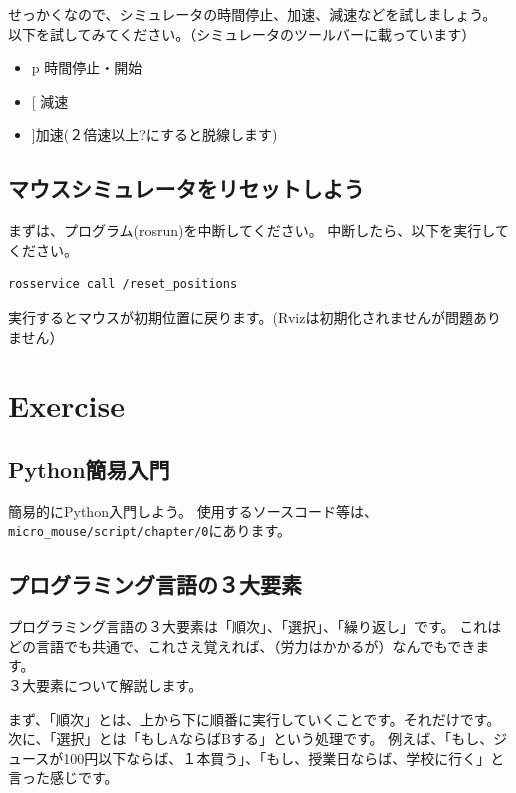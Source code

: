 \documentclass[11pt,a4paper]{jsarticle}
\begin{document}
せっかくなので、シミュレータの時間停止、加速、減速などを試しましょう。
以下を試してみてください。（シミュレータのツールバーに載っています）
\begin{itemize}
\item{ p} 時間停止・開始
\item{ [} 減速
\item{ ]}加速(２倍速以上?にすると脱線します)
\end{itemize}


\subsection{マウスシミュレータをリセットしよう}
まずは、プログラム(rosrun)を中断してください。
中断したら、以下を実行してください。
\begin{lstlisting}[frame=single]
rosservice call /reset_positions
\end{lstlisting}
実行するとマウスが初期位置に戻ります。(Rvizは初期化されませんが問題ありません）

\section{Exercise}
\subsection{Python簡易入門}
簡易的にPython入門しよう。
使用するソースコード等は、\verb|micro_mouse/script/chapter/0|にあります。

\subsection{プログラミング言語の３大要素}
プログラミング言語の３大要素は「順次」、「選択」、「繰り返し」です。
これはどの言語でも共通で、これさえ覚えれば、（労力はかかるが）なんでもできます。\\


３大要素について解説します。

まず、「順次」とは、上から下に順番に実行していくことです。それだけです。\\


次に、「選択」とは「もしAならばBする」という処理です。
例えば、「もし、ジュースが100円以下ならば、１本買う」、「もし、授業日ならば、学校に行く」と言った感じです。\\
\end{document}
